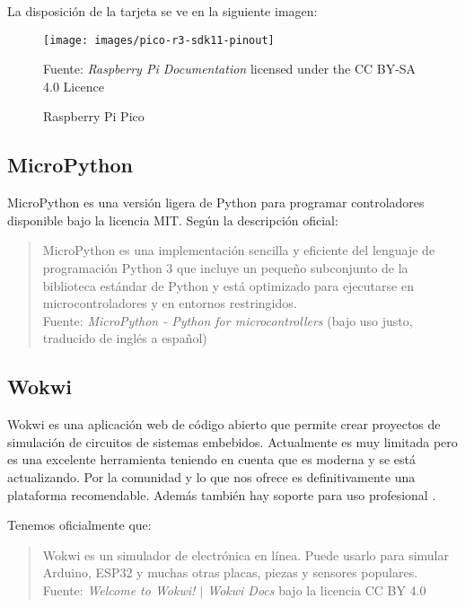 \documentclass{article}
\begin{document}
    La disposición de la tarjeta se ve en la siguiente imagen:

    \begin{figure}[H]
        \centering
        \texttt{[image: images/pico-r3-sdk11-pinout]}
        \caption{Raspberry Pi Pico}\footnotesize
        Fuente: \textit{Raspberry Pi Documentation} licensed under the CC
        BY-SA 4.0 Licence \cite{raspberry-pi-ltd-2022}
    \end{figure}

    \subsection{MicroPython}

    MicroPython es una versión ligera de Python para programar controladores
    disponible bajo la licencia MIT. Según la descripción oficial:

    \begin{quote}
        MicroPython es una implementación sencilla y eficiente del lenguaje
        de programación Python 3 que incluye un pequeño subconjunto de la
        biblioteca estándar de Python y está optimizado para ejecutarse en
        microcontroladores y en entornos restringidos.\\ \footnotesize
        Fuente: \textit{MicroPython - Python for microcontrollers} (bajo uso
        justo, traducido de inglés a español)
    \end{quote}

    \subsection{Wokwi}

    Wokwi es una aplicación web de código abierto que permite crear proyectos
    de simulación de circuitos de sistemas embebidos. Actualmente es muy
    limitada pero es una excelente herramienta teniendo en cuenta que es
    moderna y se está actualizando. Por la comunidad y lo que nos ofrece es
    definitivamente una plataforma recomendable. Además también hay soporte
    para uso profesional \cite{codemagic-ltd-2022}.

    \bigbreak

    Tenemos oficialmente que:

    \begin{quote}
        Wokwi es un simulador de electrónica en línea. Puede usarlo para
        simular Arduino, ESP32 y muchas otras placas, piezas y sensores
        populares.
        \\ \footnotesize
        Fuente: \textit{Welcome to Wokwi! $\mid$ Wokwi Docs} bajo la licencia
        CC BY 4.0
    \end{quote}
\end{document}
